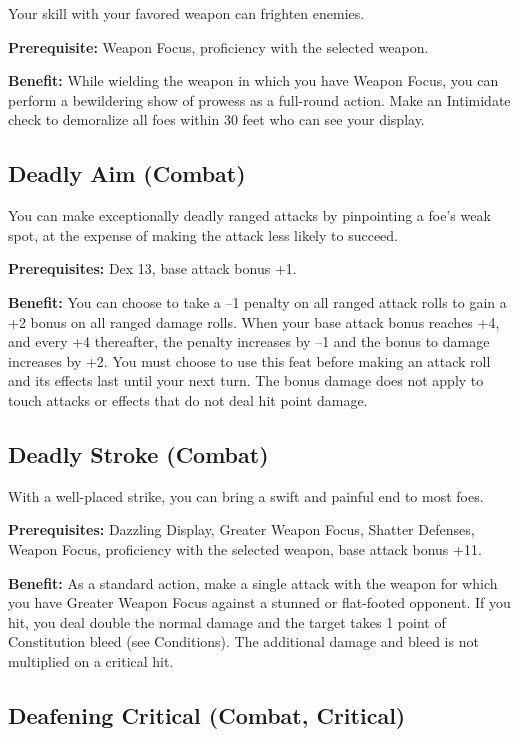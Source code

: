 				
Your skill with your favored weapon can frighten enemies.
				
\textbf{Prerequisite:} Weapon Focus, proficiency with the selected weapon.
				
\textbf{Benefit:} While wielding the weapon in which you have Weapon Focus, you can perform a bewildering show of prowess as a full-round action. Make an Intimidate check to demoralize all foes within 30 feet who can see your display. 
				
\subsection{Deadly Aim (Combat)}

				
You can make exceptionally deadly ranged attacks by pinpointing a foe's weak spot, at the expense of making the attack less likely to succeed.
				
\textbf{Prerequisites:} Dex 13, base attack bonus +1.
				
\textbf{Benefit:} You can choose to take a --1 penalty on all ranged attack rolls to gain a +2 bonus on all ranged damage rolls. When your base attack bonus reaches +4, and every +4 thereafter, the penalty increases by --1 and the bonus to damage increases by +2. You must choose to use this feat before making an attack roll and its effects last until your next turn. The bonus damage does not apply to touch attacks or effects that do not deal hit point damage.
				
\subsection{Deadly Stroke (Combat)}

				
With a well-placed strike, you can bring a swift and painful end to most foes.
				
\textbf{Prerequisites:} Dazzling Display, Greater Weapon Focus, Shatter Defenses, Weapon Focus, proficiency with the selected weapon, base attack bonus +11.
				
\textbf{Benefit:} As a standard action, make a single attack with the weapon for which you have Greater Weapon Focus against a stunned or flat-footed opponent. If you hit, you deal double the normal damage and the target takes 1 point of Constitution bleed (see Conditions). The additional damage and bleed is not multiplied on a critical hit.
				
\subsection{Deafening Critical (Combat, Critical)}

